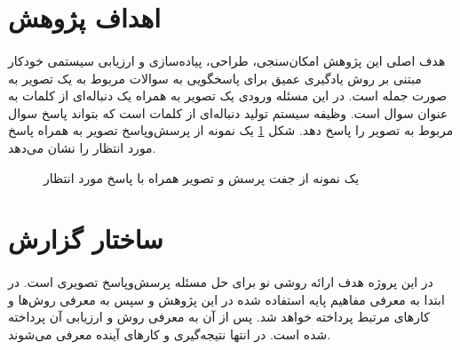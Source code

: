 \section{اهداف پژوهش}
\paragraph{}
{
    هدف اصلی این پژوهش امکان‌سنجی، طراحی، پیاده‌سازی و ارزیابی سیستمی خودکار مبتنی بر روش یادگیری عمیق
    برای پاسخگویی به سوالات مربوط به یک تصویر به صورت جمله است. در این مسئله ورودی یک تصویر به
    همراه یک دنباله‌ای از کلمات به عنوان سوال است. وظیفه سیستم تولید دنباله‌ای از
    کلمات است که بتواند پاسخ سوال مربوط به تصویر را پاسخ دهد. شکل
    \ref{fig:intro_train}
    یک نمونه از پرسش‌وپاسخ تصویر به همراه پاسخ مورد انتظار را نشان می‌دهد. 
    \begin{figure}[H]
        \caption{یک نمونه از جفت پرسش‌ و تصویر همراه با پاسخ مورد انتظار}
        \label{fig:intro_train}
    \end{figure}
}
\section{ساختار گزارش}
\paragraph{}
{
    در این پروژه هدف ارائه 
    روشی نو برای حل مسئله پرسش‌وپاسخ تصویری است. 
    در ابتدا به معرفی مفاهیم پایه استفاده شده در این پژوهش 
    و سپس به معرفی روش‌ها و کارهای مرتبط پرداخته‌ 
    خواهد شد. پس از آن به معرفی 
    روش و ارزیابی آن پرداخته شده است. در انتها نتیجه‌گیری و 
    کارهای آینده معرفی می‌شوند. 


}
